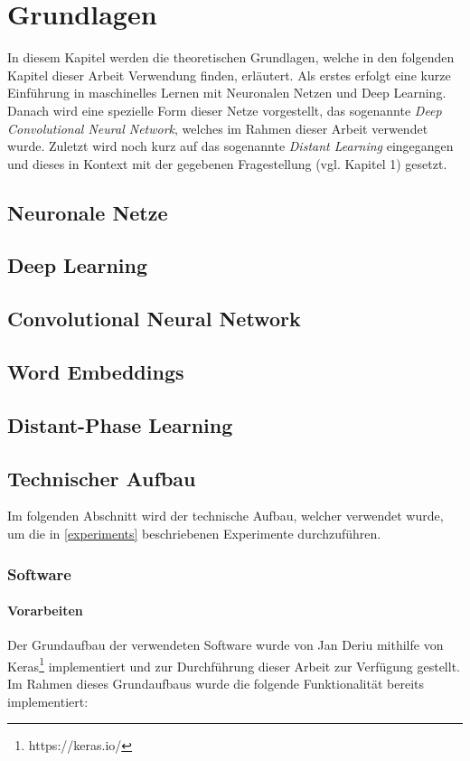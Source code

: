 \chapter{Grundlagen}
In diesem Kapitel werden die theoretischen Grundlagen, welche in den  folgenden Kapitel dieser Arbeit Verwendung finden, erläutert. Als erstes erfolgt eine kurze Einführung in maschinelles Lernen mit Neuronalen Netzen und Deep Learning. Danach wird eine spezielle Form dieser Netze vorgestellt, das sogenannte \emph{Deep Convolutional Neural Network}, welches im Rahmen dieser Arbeit verwendet wurde. Zuletzt wird noch kurz auf das sogenannte \emph{Distant Learning} \cite{deriu2016sentiment} eingegangen und dieses in Kontext mit der gegebenen Fragestellung (vgl. Kapitel 1) gesetzt.

\section{Neuronale Netze}
\blindtext
\section{Deep Learning}
\blindtext
\section{Convolutional Neural Network}
\blindtext
\section{Word Embeddings}
\blindtext
\section{Distant-Phase Learning}
\blindtext
\section{Technischer Aufbau}
Im folgenden Abschnitt wird der technische Aufbau, welcher verwendet wurde, um die in \ref{experiments} beschriebenen Experimente durchzuführen.
\subsection{Software}
\subsubsection{Vorarbeiten}
\label{technichal_setup:prework}
Der Grundaufbau der verwendeten Software wurde von Jan Deriu mithilfe von Keras\footnote{https://keras.io/} implementiert und zur Durchführung dieser Arbeit zur Verfügung gestellt. Im Rahmen dieses Grundaufbaus wurde die folgende Funktionalität bereits implementiert:

